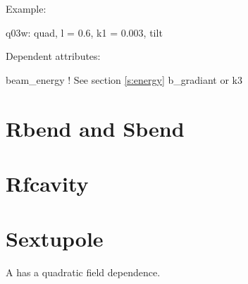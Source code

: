 \vskip0.2in \noindent
Example:
\begin{example}
  q03w: quad, l = 0.6, k1 = 0.003, tilt
\end{example}

\vskip0.2in \noindent
Dependent attributes:
\begin{example}
  beam\_energy  ! See section \ref{s:energy}
  b\_gradiant or k3
\end{example}

\section{Rbend and Sbend}
\label{s:bend}



\section{Rfcavity}
\label{s:rfcav}


\section{Sextupole}
\label{s:sex}
A  has a quadratic field dependence.

